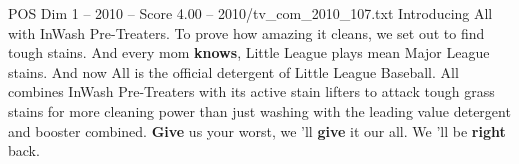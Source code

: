 \begin{textsample}{POS Dim 1 – 2010 – Score 4.00 – 2010/tv\_com\_2010\_107.txt}  \label{ex:f1_pos_066}
Introducing All with InWash Pre-Treaters.
To prove how amazing it cleans, we set out to find tough stains.
And every mom \textbf{knows}, Little League plays mean Major League stains.
And now All is the official detergent of Little League Baseball.
All combines InWash Pre-Treaters with its active stain lifters to attack tough grass stains for more cleaning power than just washing with the leading value detergent and booster combined. \textbf{Give} us your worst, we 'll \textbf{give} it our all.
We 'll be \textbf{right} back.

\end{textsample}
